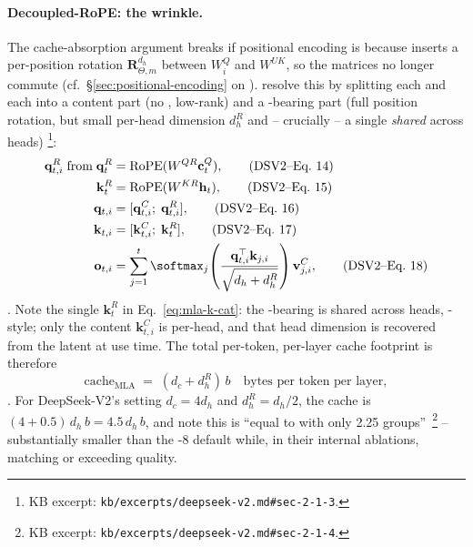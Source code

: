 \paragraph{Decoupled-RoPE: the wrinkle.}
The cache-absorption argument breaks if positional encoding is 
because  inserts a per-position rotation
$\boldsymbol{R}^{d_h}_{\Theta, m}$ between $W_i^Q$ and $W^{UK}$, so
the matrices no longer commute (cf.\ \S\ref{sec:positional-encoding}
on ). \citet{deepseek-v2} resolve this by splitting each 
and each  into a content part (no , low-rank) and a
-bearing part (full position rotation, but small per-head
dimension $d_h^R$ and -- crucially -- a single \emph{shared} 
 across heads)%
\footnote{KB excerpt: \nolinkurl{kb/excerpts/deepseek-v2.md#sec-2-1-3}.}:
\begin{align}
  \mathbf{q}_{t,i}^R\;\text{from}\;\mathbf{q}_t^R
   &= \mathrm{RoPE}(W^{QR} \mathbf{c}_t^Q),
   \tag{DSV2--Eq.~14} \label{eq:mla-qr} \\
  \mathbf{k}_t^R
   &= \mathrm{RoPE}(W^{KR} \mathbf{h}_t),
   \tag{DSV2--Eq.~15} \label{eq:mla-kr} \\
  \mathbf{q}_{t,i}
   &= [\mathbf{q}_{t,i}^C;\;\mathbf{q}_{t,i}^R],
   \tag{DSV2--Eq.~16} \label{eq:mla-q-cat} \\
  \mathbf{k}_{t,i}
   &= [\mathbf{k}_{t,i}^C;\;\mathbf{k}_t^R],
   \tag{DSV2--Eq.~17} \label{eq:mla-k-cat} \\
  \mathbf{o}_{t,i}
   &= \sum_{j=1}^{t} \softmax_j\!\left(
     \frac{\mathbf{q}_{t,i}^\top \mathbf{k}_{j,i}}
          {\sqrt{d_h + d_h^R}}\right)
     \mathbf{v}_{j,i}^C,
   \tag{DSV2--Eq.~18} \label{eq:mla-out}
\end{align}
\citep[\S 2.1.3, Eq.~14--18]{deepseek-v2}. Note the single
$\mathbf{k}_t^R$ in Eq.~\eqref{eq:mla-k-cat}: the -bearing  is
shared across heads, -style; only the content 
$\mathbf{k}_{t,i}^C$ is per-head, and that head dimension is
recovered from the latent at use time. The total per-token,
per-layer cache footprint is therefore
\begin{equation}
  \mathrm{cache}_{\mathrm{MLA}}
   \;=\; (d_c + d_h^R)\,b
   \quad\text{bytes per token per layer},
  \label{eq:mla-cache}
\end{equation}
\citep[\S 2.1.3]{deepseek-v2}. For DeepSeek-V2's setting
$d_c = 4 d_h$ and $d_h^R = d_h/2$, the cache is
$(4 + 0.5)\,d_h\,b = 4.5\,d_h\,b$, and \citet{deepseek-v2} note this
is ``equal to  with only 2.25 groups''~\citep[\S
2.1.4]{deepseek-v2}\footnote{KB excerpt:
\nolinkurl{kb/excerpts/deepseek-v2.md#sec-2-1-4}.} -- substantially
smaller than the -8 default while, in their internal ablations,
matching or exceeding  quality.

